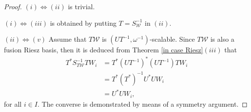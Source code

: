 \documentclass[sn-mathphys-num]{sn-jnl}%
\theoremstyle{definition}
\theoremstyle{remark}
\numberwithin{equation}{section}
\begin{document}
\begin{proof}
$(i)\Leftrightarrow (ii)$ is trivial.

$(i)\Leftrightarrow (iii)$ is obtained by putting $T=S_{\mathcal{W}}^{-1}$ in $(ii)$.

$(ii)\Leftrightarrow (v)$ Assume that $T\mathcal{W}$ is $\left( UT^{-1},\omega^{-1}\right) $-scalable. Since $T\mathcal{W}$ is also a fusion Riesz basis, then it is deduced from Theorem \ref{in case Riesz}$(iii)$ that
\begin{align*}
T^{*}S_{T\mathcal{W}}^{-1}TW_{i}&=T^{*}\left( UT^{-1}\right) ^{*}\left( UT^{-1}\right) TW_{i}
\\&=T^{*}\left( T^{*}\right) ^{-1}U^{*}UW_{i}
\\&=U^{*}UW_{i},
\end{align*}
for all $i \in I.$ The converse is demonstrated by means of a symmetry argument.


\end{proof}
\end{document}
